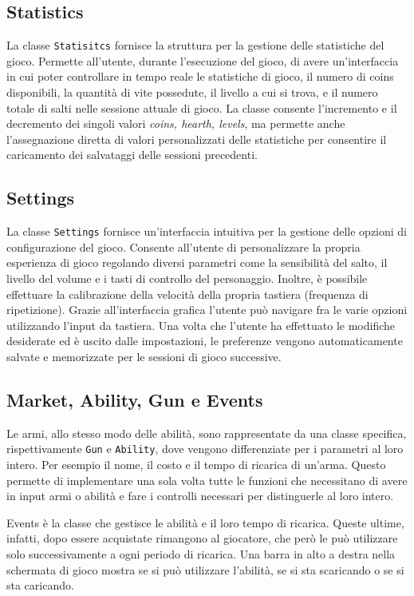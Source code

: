 \documentclass[a4paper]{article}
\begin{document}
\subsection{Statistics}
La classe \texttt{Statisitcs} fornisce la struttura per la gestione delle statistiche del gioco.
Permette all’utente, durante l’esecuzione del gioco, di avere un’interfaccia in cui poter controllare 
in tempo reale le statistiche di gioco, il numero di coins disponibili, la quantità di vite possedute,
il livello a cui si trova, e il numero totale di salti nelle sessione attuale di gioco. 
La classe consente l’incremento e il decremento dei singoli valori \textit{coins, hearth, levels}, 
ma permette anche l’assegnazione diretta di valori personalizzati delle statistiche per consentire
il caricamento dei salvataggi delle sessioni precedenti.

\subsection{Settings}
La classe \texttt{Settings} fornisce un'interfaccia intuitiva per la gestione delle opzioni
di configurazione del gioco. Consente all’utente di personalizzare la propria esperienza 
di gioco regolando diversi parametri come la sensibilità del salto, il livello del volume 
e i tasti di controllo del personaggio. Inoltre, è possibile effettuare la calibrazione 
della velocità della propria tastiera (frequenza di ripetizione). Grazie all’interfaccia 
grafica l’utente può navigare fra le varie opzioni utilizzando l’input da tastiera. 
Una volta che l’utente ha effettuato le modifiche desiderate ed è uscito dalle impostazioni, 
le preferenze vengono automaticamente salvate e memorizzate per le sessioni di gioco successive.

\subsection{Market, Ability, Gun e Events}
Le armi, allo stesso modo delle abilità, sono rappresentate da una classe 
specifica, rispettivamente \texttt{Gun} e \texttt{Ability}, dove vengono
differenziate per i parametri al loro intero. Per esempio il nome, il costo e il 
tempo di ricarica di un'arma. Questo permette di implementare una sola volta 
tutte le funzioni che necessitano di avere in input armi o abilità e fare i 
controlli necessari per distinguerle al loro intero.

Events è la classe che gestisce le abilità e il loro tempo di ricarica. Queste
ultime, infatti, dopo essere acquistate rimangono al giocatore, che però le può
utilizzare solo successivamente a ogni periodo di ricarica. Una barra in alto a
destra nella schermata di gioco mostra se si può utilizzare l'abilità, se si sta
scaricando o se si sta caricando.
\end{document}
